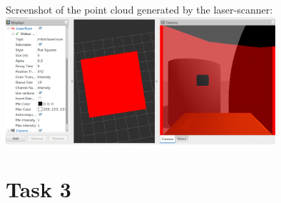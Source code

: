 Screenshot of the point cloud generated by the laser-scanner:\\
\includegraphics[width=0.75\textwidth]{img/screen_ue5_t2_laser.png}

\section{Task 3}\label{ass5_t3}

